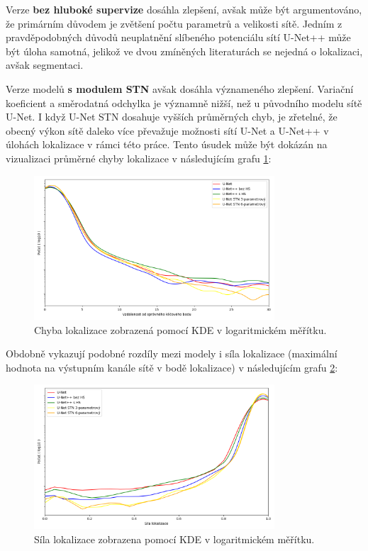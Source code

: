 Verze \textbf{bez hluboké supervize} dosáhla zlepšení, avšak může být argumentováno, že primárním důvodem je zvětšení počtu parametrů a velikosti sítě. Jedním z pravděpodobných důvodů neuplatnění slíbeného potenciálu sítí U-Net++ může být úloha samotná, jelikož ve dvou zmíněných literaturách se nejedná o lokalizaci, avšak segmentaci.

Verze modelů \textbf{s modulem STN} avšak dosáhla význameného zlepšení. Variační koeficient a směrodatná odchylka je významně nižší, než u původního modelu sítě U-Net. I když U-Net STN dosahuje vyšších průměrných chyb, je zřetelné, že obecný výkon sítě daleko více převažuje možnosti sítí U-Net a U-Net++ v úlohách lokalizace v rámci této práce. Tento úsudek může být dokázán na vizualizaci průměrné chyby lokalizace v následujícím grafu \ref{fig:loc_distance}:
\pagebreak
\begin{figure}[ht]
\centering
\includegraphics[width=0.8\textwidth,keepaspectratio]{Figures/plots/loc_distance.png}
\caption[Chyba lokalizace modelů]{Chyba lokalizace zobrazená pomocí KDE v logaritmickém měřítku. }
\label{fig:loc_distance}
\end{figure}

Obdobně vykazují podobné rozdíly mezi modely i síla lokalizace (maximální hodnota na výstupním kanále sítě v bodě lokalizace) v následujícím grafu \ref{fig:loc_strength}:

\begin{figure}[H]
\centering
\includegraphics[width=0.8\textwidth,keepaspectratio]{Figures/plots/loc_strength.png}
\caption[Síla lokalizace modelů]{Síla lokalizace zobrazena pomocí KDE v logaritmickém měřítku. }
\label{fig:loc_strength}
\end{figure}


